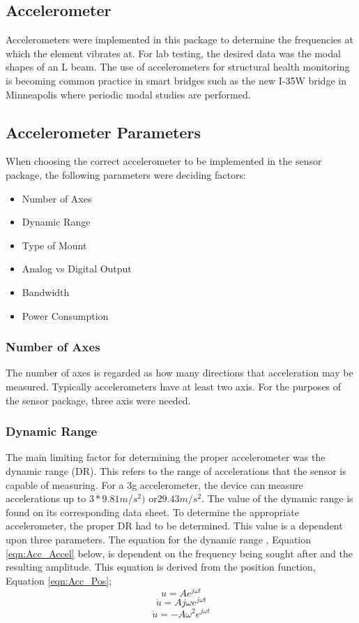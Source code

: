 \subsection{Accelerometer}
\indent Accelerometers were implemented in this package to determine the frequencies at which the element vibrates at. For lab testing, the desired data was the modal shapes of an L beam. The use of accelerometers for structural health monitoring is becoming common practice in smart bridges such as the new I-35W bridge in Minneapolis where periodic modal studies are performed\cite{Kistler}.

\subsection{Accelerometer Parameters}
\indent When choosing the correct accelerometer to be implemented in the sensor package, the following parameters were deciding factors:
\begin{itemize}
\item Number of Axes
\item Dynamic Range
\item Type of Mount
\item Analog vs Digital Output
\item Bandwidth
\item Power Consumption
\end{itemize}

\subsubsection{Number of Axes}
\indent The number of axes is regarded as how many directions that acceleration may be measured. Typically accelerometers have at least two axis. For the purposes of the sensor package, three axis were needed.
\subsubsection{Dynamic Range}
\indent The main limiting factor for determining the proper accelerometer was the dynamic range (DR).  This refers to the range of accelerations that the sensor is capable of measuring. For a 3g accelerometer, the device can measure accelerations up to $3*9.81m/s^{2})$ or$ 29.43 m/s^{2}$.  The value of the dynamic range is found on its corresponding data sheet.  To determine the appropriate accelerometer, the proper DR had to be determined.  This value is a dependent upon three parameters.  The equation for the dynamic range , Equation \ref{eqn:Acc_Accel} below, is dependent on the frequency being sought after and the resulting amplitude.  This equation is derived from the position function, Equation \ref{eqn:Acc_Pos};  
\begin{equation}
u = Ae^{j\omega t}
\label{eqn:Acc_Pos}
\end{equation}
\begin{equation}
\dot{u} = Aj\omega e^{j\omega t}
\label{eqn:Acc_Vel}
\end{equation}
\begin{equation}
\ddot{u} = -A\omega^{2}e^{j\omega t}
\label{eqn:Acc_Accel}
\end{equation}

